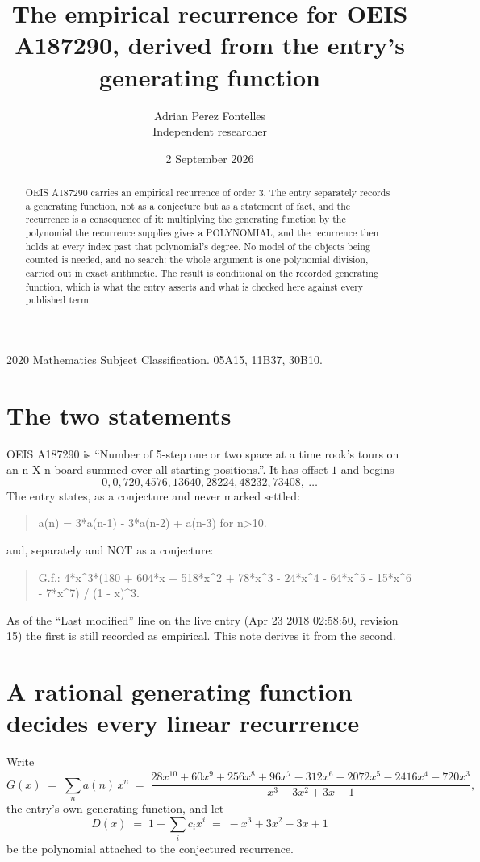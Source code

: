 \documentclass[11pt,a4paper]{article}
\title{The empirical recurrence for OEIS A187290, derived from the entry's generating function}
\author{Adrian Perez Fontelles\\ \small Independent researcher}
\date{2 September 2026}
\theoremstyle{plain}
\theoremstyle{definition}
\begin{document}
\maketitle

\begin{abstract}
OEIS A187290 carries an empirical recurrence of order $3$. The entry separately records a
generating function, not as a conjecture but as a statement of fact, and the recurrence is a
consequence of it: multiplying the generating function by the polynomial the recurrence
supplies gives a POLYNOMIAL, and the recurrence then holds at every index past that
polynomial's degree. No model of the objects being counted is needed, and no search: the
whole argument is one polynomial division, carried out in exact arithmetic. The result is
conditional on the recorded generating function, which is what the entry asserts and what is
checked here against every published term.
\end{abstract}

\noindent\small 2020 Mathematics Subject Classification. 05A15, 11B37, 30B10.\normalsize

\section{The two statements}

OEIS A187290 is ``Number of 5-step one or two space at a time rook's tours on an n X n board summed over all starting positions.''. It has offset $1$ and begins
\[
0, 0, 720, 4576, 13640, 28224, 48232, 73408,\ \dots
\]
The entry states, as a conjecture and never marked settled:
\begin{quote}
a(n) = 3*a(n-1) - 3*a(n-2) + a(n-3) for n>10.
\end{quote}
and, separately and NOT as a conjecture:
\begin{quote}
G.f.: 4*x\^{}3*(180 + 604*x + 518*x\^{}2 + 78*x\^{}3 - 24*x\^{}4 - 64*x\^{}5 - 15*x\^{}6 - 7*x\^{}7) / (1 - x)\^{}3.
\end{quote}
As of the ``Last modified'' line on the live entry (Apr 23 2018 02:58:50, revision 15) the first is still
recorded as empirical. This note derives it from the second.

\section{A rational generating function decides every linear recurrence}

Write
\[
G(x)\;=\;\sum_{n}a(n)\,x^{n}\;=\;\frac{28 x^{10} + 60 x^{9} + 256 x^{8} + 96 x^{7} - 312 x^{6} - 2072 x^{5} - 2416 x^{4} - 720 x^{3}}{x^{3} - 3 x^{2} + 3 x - 1},
\]
the entry's own generating function, and let
\[
D(x)\;=\;1-\sum_i c_i x^{i}\;=\;- x^{3} + 3 x^{2} - 3 x + 1
\]
be the polynomial attached to the conjectured recurrence.
\end{document}
